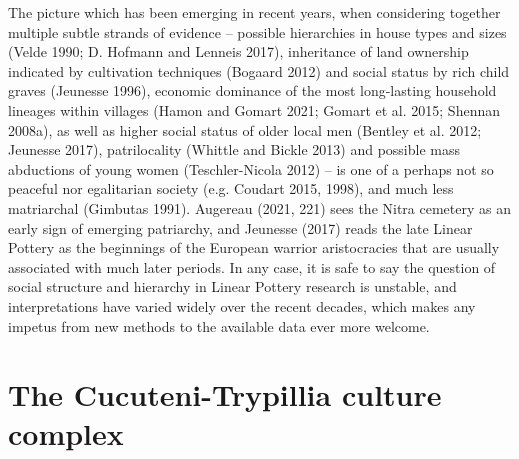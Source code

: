 \documentclass[
  12pt,
  a4paper, twoside]{book}
\begin{document}
The picture which has been emerging in recent years, when considering together multiple subtle strands of evidence -- possible hierarchies in house types and sizes (Velde 1990; D. Hofmann and Lenneis 2017), inheritance of land ownership indicated by cultivation techniques (Bogaard 2012) and social status by rich child graves (Jeunesse 1996), economic dominance of the most long-lasting household lineages within villages (Hamon and Gomart 2021; Gomart et al. 2015; Shennan 2008a), as well as higher social status of older local men (Bentley et al. 2012; Jeunesse 2017), patrilocality (Whittle and Bickle 2013) and possible mass abductions of young women (Teschler-Nicola 2012) -- is one of a perhaps not so peaceful nor egalitarian society (e.g. Coudart 2015, 1998), and much less matriarchal (Gimbutas 1991). Augereau (2021, 221) sees the Nitra cemetery as an early sign of emerging patriarchy, and Jeunesse (2017) reads the late Linear Pottery as the beginnings of the European warrior aristocracies that are usually associated with much later periods. In any case, it is safe to say the question of social structure and hierarchy in Linear Pottery research is unstable, and interpretations have varied widely over the recent decades, which makes any impetus from new methods to the available data ever more welcome.

\hypertarget{trypillia}{%
\section{The Cucuteni-Trypillia culture complex}\label{trypillia}}
\end{document}
